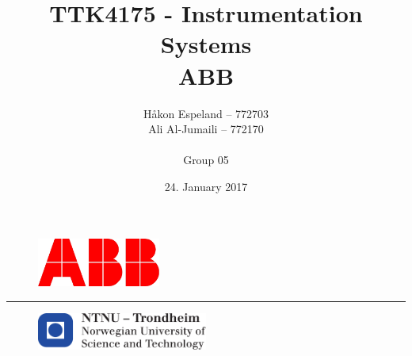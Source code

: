 \documentclass{article}
\title{TTK4175 - Instrumentation Systems\\\LARGE{\textbf{ABB}}}
\author{Håkon Espeland -- 772703 \\ Ali Al-Jumaili -- 772170 \\\\ Group 05}
\date{24. January 2017}
\begin{document}
\begin{figure}
    \centering
    \includegraphics[width=0.36\textwidth]{images/ABB_standard}
    \end{figure}

\begin{titlepage}
    \maketitle
    \rule{\linewidth}{0.5mm}
    \begin{figure}
    \centering
    \includegraphics[width=0.5\textwidth]{images/logontnu_eng}
    \end{figure}
    \thispagestyle{empty}
\end{titlepage}
\newpage\null\thispagestyle{empty}\newpage
\tableofcontents
\thispagestyle{empty} %
\newpage   


\setcounter{page}{1}






\end{document}
